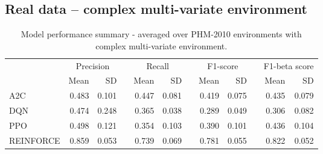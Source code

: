 \documentclass[]{article}
\newcommand{\rowspace}[1]{\renewcommand{\arraystretch}{#1}}
\begin{document}
\subsection{Real data -- complex multi-variate environment}
\begin{table*}[hbt!]\centering
	\rowspace{1.3}
	\begin{tabular}{@{}l rr c rr c rr c rr@{}}
		\arrayrulecolor{black!40}\toprule
		& \multicolumn{2}{c}{Precision} & \phantom{i} & \multicolumn{2}{c}{Recall} & \phantom{i} & \multicolumn{2}{c}{F1-score} & \phantom{i} & \multicolumn{2}{c}{F1-beta score} \\
		\cmidrule{2-3} \cmidrule{5-6} \cmidrule{8-9} \cmidrule{11-12} 
		
		&Mean &SD & &Mean &SD & &Mean &SD& &Mean & SD\\ \midrule
		A2C & 0.483 & 0.101 & &0.447 & 0.081 & & 0.419 & 0.075 & &0.435 &0.079 \\
		DQN & 0.474 & 0.248 & &0.365 & 0.038 & & 0.289 & 0.049 & &0.306 &0.082 \\
		PPO & 0.498 & 0.121 & &0.354 & 0.103 & & 0.390 & 0.101 & &0.436 &0.104 \\
		REINFORCE & 0.859 & 0.053 & &0.739 & 0.069 & & 0.781 & 0.055 & &0.822 &0.052 \\
		\bottomrule
	\end{tabular}
	\caption{Model performance summary - averaged over PHM-2010 environments with complex multi-variate environment.}
	\label{tbl:PHMMS}
\end{table*}


%		
\newpage
\end{document}
